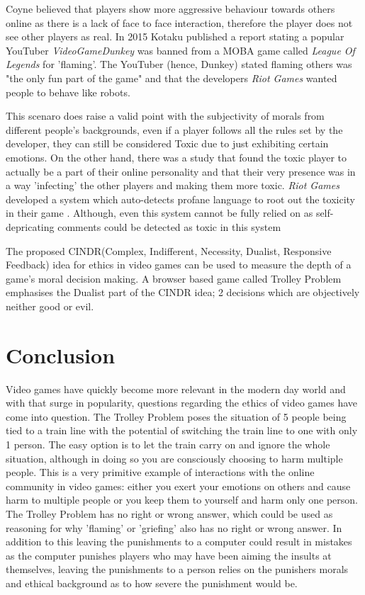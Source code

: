 \documentclass[12pt]{article}
\begin{document}
Coyne believed that players show more aggressive behaviour towards others online as there is a lack of face to face interaction, therefore the player does not see other players as real. In 2015 Kotaku \cite{hernandez_2015} published a report stating a popular YouTuber \textit{VideoGameDunkey} was banned from a MOBA game called \textit{League Of Legends} \cite{leagueoflegends} for 'flaming'. The YouTuber (hence, Dunkey) stated flaming others was "the only fun part of the game" and that the developers \textit{Riot Games} wanted people to behave like robots.

This scenaro does raise a valid point with the subjectivity of morals from different people's backgrounds, even if a player follows all the rules set by the developer, they can still be considered Toxic \cite{Kwak:2014:UTB:2567948.2580066} due to just exhibiting certain emotions. On the other hand, there was a study \cite{Neto:2017:STB:3106426.3106452} that found the toxic player to actually be a part of their online personality and that their very presence was in a way 'infecting' the other players and making them more toxic. \textit{Riot Games} developed a system which auto-detects profane language to root out the toxicity in their game \cite{Martens:2015:TDM:2984075.2984080}. Although, even this system cannot be fully relied on as self-depricating comments could be detected as toxic in this system \cite{Martens:2015:TDM:2984075.2984080}


The proposed CINDR(Complex, Indifferent, Necessity, Dualist, Responsive Feedback)\cite{7048084} idea for ethics in video games can be used to measure the depth of a game's moral decision making. A browser based game called Trolley Problem \cite{trolleyproblem-pippinbarr} emphasises the Dualist part of the CINDR idea; 2 decisions which are objectively neither good or evil. 


\section{Conclusion}
Video games have quickly become more relevant in the modern day world and with that surge in popularity, questions regarding the ethics of video games have come into question. The Trolley Problem \cite{7344559} poses the situation of 5 people being tied to a train line with the potential of switching the train line to one with only 1 person.
The easy option is to let the train carry on and ignore the whole situation, although in doing so you are consciously choosing to harm multiple people. This is a very primitive example of interactions with the online community in video games: either you exert your emotions on others and cause harm to multiple people or you keep them to yourself and harm only one person. 
The Trolley Problem has no right or wrong answer, which could be used as reasoning for why 'flaming' or 'griefing' also has no right or wrong answer. In addition to this leaving the punishments to a computer could result in mistakes as the computer punishes players who may have been aiming the insults at themselves, leaving the punishments to a person relies on the punishers morals and ethical background as to how severe the punishment would be.




\end{document}
